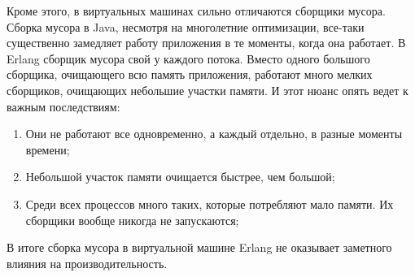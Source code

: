 \documentclass[10pt, a5paper]{article}
\begin{document}
Кроме этого, в виртуальных машинах сильно отличаются сборщики мусора. Сборка мусора в Java, несмотря на многолетние оптимизации, все-таки существенно замедляет работу приложения в те моменты, когда она работает. В Erlang сборщик мусора свой у каждого потока. Вместо одного большого сборщика, очищающего всю память приложения, работают много мелких сборщиков, очищающих небольшие участки памяти. И этот нюанс опять ведет к важным последствиям:

\begin{enumerate}
  \item Они не работают все одновременно, а каждый отдельно, в разные моменты времени;
  \item Небольшой участок памяти очищается быстрее, чем большой;
  \item Среди всех процессов много таких, которые потребляют мало памяти. Их сборщики вообще никогда не запускаются;
\end{enumerate}

В итоге сборка мусора в виртуальной машине Erlang не оказывает заметного влияния на производительность.
\end{document}
